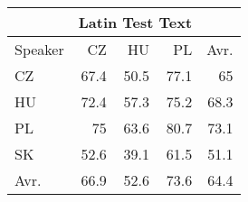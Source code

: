 \begin{tabular}{l|rrr|r}
\hline
 & \multicolumn{3}{c}{Latin Test Text} & \\
\hline
 Speaker   &   CZ &   HU &   PL &   Avr. \\
\hline
 CZ        & 67.4 & 50.5 & 77.1 &   65   \\
 HU        & 72.4 & 57.3 & 75.2 &   68.3 \\
 PL        & 75   & 63.6 & 80.7 &   73.1 \\
 SK        & 52.6 & 39.1 & 61.5 &   51.1 \\
\hline
 Avr.     & 66.9 & 52.6 & 73.6 &   64.4 \\
\hline
\end{tabular}